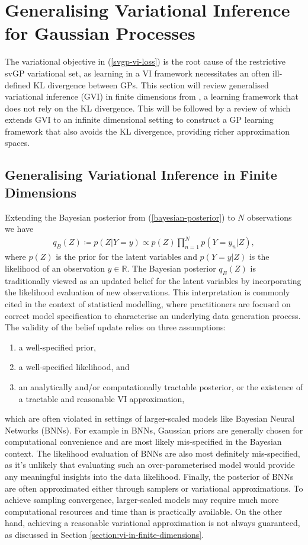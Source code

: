 \documentclass{article}
\numberwithin{equation}{section}
\begin{document}
\newpage 
\section{Generalising Variational Inference for Gaussian Processes}
The variational objective in (\ref{svgp-vi-loss}) is the root cause of the restrictive svGP variational set, as learning in a VI framework necessitates an often ill-defined KL divergence between GPs. 
This section will review generalised variational inference (GVI) in finite dimensions from \cite{knoblauch2022optimization}, a learning framework that does not rely on the KL divergence. 
This will be followed by a review of \cite{wild2022generalized} which extends GVI to an infinite dimensional setting to construct a GP learning framework that also avoids the KL divergence, providing richer approximation spaces.

\subsection{Generalising Variational Inference in Finite Dimensions}
Extending the Bayesian posterior from (\ref{bayesian-posterior}) to $N$ observations we have
\begin{align}
    \label{bayesian-posterior-gvi}
    q_B(Z) \coloneqq p(Z\vert Y=y) \propto p(Z) \prod_{n=1}^N p(Y=y_n \vert Z),
\end{align}
where $p(Z)$ is the prior for the latent variables and $p(Y=y \vert Z)$ is the likelihood of an observation $y \in \mathbb{R}$. 
The Bayesian posterior $q_B(Z)$ is traditionally viewed as an updated belief for the latent variables by incorporating the likelihood evaluation of new observations.
This interpretation is commonly cited in the context of statistical modelling, where practitioners are focused on correct model specification to characterise an underlying data generation process. The validity of the belief update relies on three assumptions:
\begin{enumerate}
    \item a well-specified prior,
    \item a well-specified likelihood, and
    \item an analytically and/or computationally tractable posterior, or the existence of a tractable and reasonable VI approximation,
\end{enumerate}
which are often violated in settings of larger-scaled models like Bayesian Neural Networks (BNNs). 
For example in BNNs, Gaussian priors are generally chosen for computational convenience and are most likely mis-specified in the Bayesian context. 
The likelihood evaluation of BNNs are also most definitely mis-specified, as it's unlikely that evaluating such an over-parameterised model would provide any meaningful insights into the data likelihood. 
Finally, the posterior of BNNs are often approximated either through samplers or variational approximations. 
To achieve sampling convergence, larger-scaled models may require much more computational resources and time than is practically available. 
On the other hand, achieving a reasonable variational approximation is not always guaranteed, as discussed in Section \ref{section:vi-in-finite-dimensions}.
\end{document}
